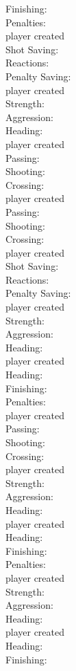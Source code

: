\documentclass[]{article}
\begin{document}
{Finishing:\\
Penalties:\\
player created\\
Shot Saving:\\
Reactions:\\
Penalty Saving:\\
player created\\
Strength:\\
Aggression:\\
Heading:\\
player created\\
Passing:\\
Shooting:\\
Crossing:\\
player created\\
Passing:\\
Shooting:\\
Crossing:\\
player created\\
Shot Saving:\\
Reactions:\\
Penalty Saving:\\
player created\\
Strength:\\
Aggression:\\
Heading:\\
player created\\
Heading:\\
Finishing:\\
Penalties:\\
player created\\
Passing:\\
Shooting:\\
Crossing:\\
player created\\
Strength:\\
Aggression:\\
Heading:\\
player created\\
Heading:\\
Finishing:\\
Penalties:\\
player created\\
Strength:\\
Aggression:\\
Heading:\\
player created\\
Heading:\\
Finishing:\\
}
\end{document}
